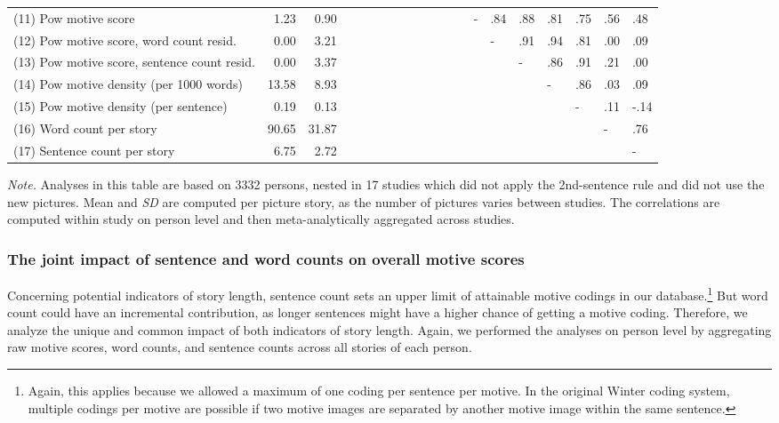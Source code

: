 \documentclass[man,a4paper,mask]{apa6}\usepackage[]{graphicx}\usepackage[]{color}
\begin{document}
\begin{table}
\begin{threeparttable}
\begin{tabularx}{\textwidth}{Xrrlllllllllllllllll}
  (11) Pow motive score & 1.23 & 0.90 &  &  &  &  &  &  &  &  &  &  & - & .84 & .88 & .81 & .75 & .56 & .48 \\ 
  (12) Pow motive score, word count resid. & 0.00 & 3.21 &  &  &  &  &  &  &  &  &  &  &  & - & .91 & .94 & .81 & .00 & .09 \\ 
  (13) Pow motive score, sentence count resid. & 0.00 & 3.37 &  &  &  &  &  &  &  &  &  &  &  &  & - & .86 & .91 & .21 & .00 \\ 
  (14) Pow motive density (per 1000 words) & 13.58 & 8.93 &  &  &  &  &  &  &  &  &  &  &  &  &  & - & .86 & .03 & .09 \\ 
  (15) Pow motive density (per sentence) & 0.19 & 0.13 &  &  &  &  &  &  &  &  &  &  &  &  &  &  & - & .11 & -.14 \\ 
  (16) Word count per story & 90.65 & 31.87 &  &  &  &  &  &  &  &  &  &  &  &  &  &  &  & - & .76 \\ 
  (17) Sentence count per story & 6.75 & 2.72 &  &  &  &  &  &  &  &  &  &  &  &  &  &  &  &  & - \\ 
   \hline

		\bottomrule
		\end{tabularx}
		\begin{tablenotes}[para,flushleft]
			{\small
			\vspace*{0.75em}
			\textit{Note.} Analyses in this table are based on 3332 persons, nested in 17 studies which did not apply the 2nd-sentence rule and did not use the new pictures. Mean and \emph{SD} are computed per picture story, as the number of pictures varies between studies. The correlations are computed within study on person level and then meta-analytically aggregated across studies.}
	      \end{tablenotes}
	  \end{threeparttable}
\end{table}


\subsubsection{The joint impact of sentence and word counts on overall motive scores}
Concerning potential indicators of story length, sentence count sets an upper limit of attainable motive codings in our database.\footnote{Again, this applies because we allowed a maximum of one coding per sentence per motive. In the original Winter coding system, multiple codings per motive are possible if two motive images are separated by another motive image within the same sentence.} But word count could have an incremental contribution, as longer sentences might have a higher chance of getting a motive coding. Therefore, we analyze the unique and common impact of both indicators of story length. Again, we performed the analyses on person level by aggregating raw motive scores, word counts, and sentence counts across all stories of each person.
\end{document}

